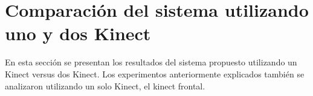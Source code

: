 \section{Comparación del sistema utilizando uno y dos Kinect} 

En esta sección se presentan los resultados del sistema propuesto utilizando un Kinect versus dos Kinect. Los experimentos anteriormente explicados también se analizaron utilizando un solo Kinect, el kinect frontal. 




\newpage
%
%
%
